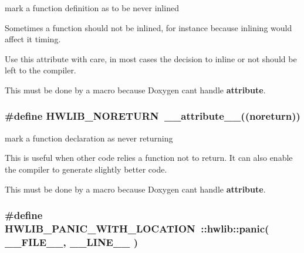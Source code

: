 mark a function definition as to be never inlined 

Sometimes a function should not be inlined, for instance because inlining would affect it timing.

Use this attribute with care, in most cases the decision to inline or not should be left to the compiler.

This must be done by a macro because Doxygen can\textquotesingle{}t handle {\bfseries attribute}. 
\subsubsection[{\texorpdfstring{H\+W\+L\+I\+B\+\_\+\+N\+O\+R\+E\+T\+U\+RN}{HWLIB_NORETURN}}]{\setlength{\rightskip}{0pt plus 5cm}\#define H\+W\+L\+I\+B\+\_\+\+N\+O\+R\+E\+T\+U\+RN~\+\_\+\+\_\+attribute\+\_\+\+\_\+((noreturn))}\hypertarget{hwlib-defines_8hpp_aef311f1f416fdcbd1fa22376dcc01029}{}\label{hwlib-defines_8hpp_aef311f1f416fdcbd1fa22376dcc01029}


mark a function declaration as never returning 

This is useful when other code relies a function not to return. It can also enable the compiler to generate slightly better code.

This must be done by a macro because Doxygen can\textquotesingle{}t handle {\bfseries attribute}. 
\subsubsection[{\texorpdfstring{H\+W\+L\+I\+B\+\_\+\+P\+A\+N\+I\+C\+\_\+\+W\+I\+T\+H\+\_\+\+L\+O\+C\+A\+T\+I\+ON}{HWLIB_PANIC_WITH_LOCATION}}]{\setlength{\rightskip}{0pt plus 5cm}\#define H\+W\+L\+I\+B\+\_\+\+P\+A\+N\+I\+C\+\_\+\+W\+I\+T\+H\+\_\+\+L\+O\+C\+A\+T\+I\+ON~\+::{\bf hwlib\+::panic}( \+\_\+\+\_\+\+F\+I\+L\+E\+\_\+\+\_\+, \+\_\+\+\_\+\+L\+I\+N\+E\+\_\+\+\_\+ )}\hypertarget{hwlib-defines_8hpp_a63e41f8f1231b208819549fe26a58440}{}\label{hwlib-defines_8hpp_a63e41f8f1231b208819549fe26a58440}


